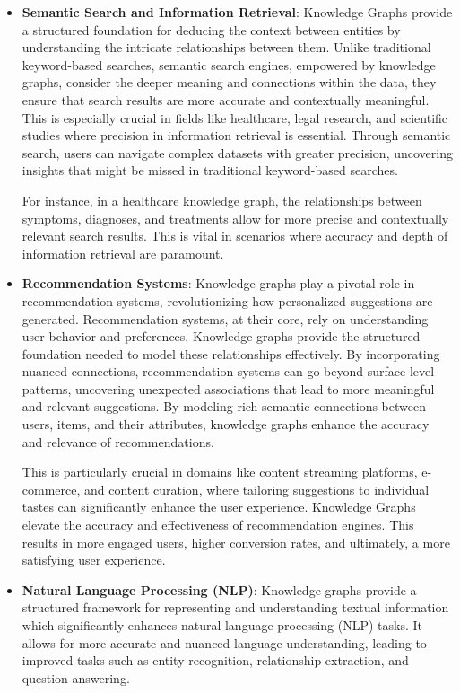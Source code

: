 \begin{itemize}
    \item \textbf{Semantic Search and Information Retrieval}:
    Knowledge Graphs provide a structured foundation for deducing the context between entities by understanding the intricate relationships between them. Unlike traditional keyword-based searches, semantic search engines, empowered by knowledge graphs, consider the deeper meaning and connections within the data, they ensure that search results are more accurate and contextually meaningful. This is especially crucial in fields like healthcare, legal research, and scientific studies where precision in information retrieval is essential. Through semantic search, users can navigate complex datasets with greater precision, uncovering insights that might be missed in traditional keyword-based searches.

    For instance, in a healthcare knowledge graph, the relationships between symptoms, diagnoses, and treatments allow for more precise and contextually relevant search results. This is vital in scenarios where accuracy and depth of information retrieval are paramount.

    
    \item \textbf{Recommendation Systems}:
    Knowledge graphs play a pivotal role in recommendation systems, revolutionizing how personalized suggestions are generated. Recommendation systems, at their core, rely on understanding user behavior and preferences. Knowledge graphs provide the structured foundation needed to model these relationships effectively. By incorporating nuanced connections, recommendation systems can go beyond surface-level patterns, uncovering unexpected associations that lead to more meaningful and relevant suggestions. By modeling rich semantic connections between users, items, and their attributes, knowledge graphs enhance the accuracy and relevance of recommendations. 
    
    This is particularly crucial in domains like content streaming platforms, e-commerce, and content curation, where tailoring suggestions to individual tastes can significantly enhance the user experience. Knowledge Graphs elevate the accuracy and effectiveness of recommendation engines. This results in more engaged users, higher conversion rates, and ultimately, a more satisfying user experience.

    \item \textbf{Natural Language Processing (NLP)}:
    Knowledge graphs provide a structured framework for representing and understanding textual information which significantly enhances natural language processing (NLP) tasks. It allows for more accurate and nuanced language understanding, leading to improved tasks such as entity recognition, relationship extraction, and question answering.


\end{itemize}
